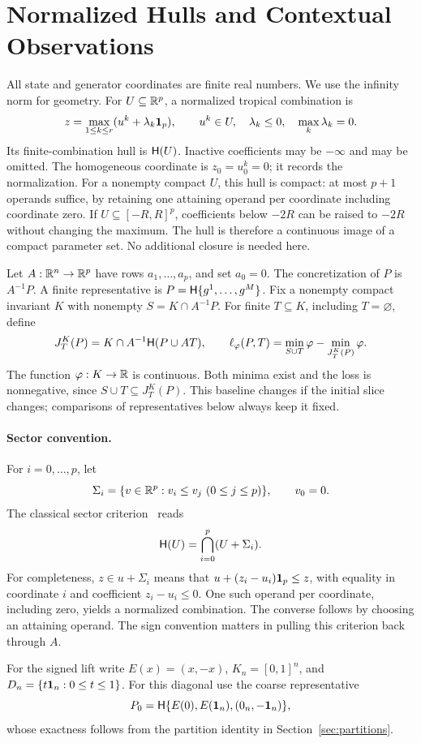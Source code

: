 \section{Normalized Hulls and Contextual Observations}\label{sec:contexts}
All state and generator coordinates are finite real numbers. We use the infinity norm for geometry. For $U\subseteq\mathbb R^p$, a normalized tropical combination is
\[
z=\max_{1\le k\le r}(u^k+\lambda_k\mathbf 1_p),\qquad
u^k\in U,\quad \lambda_k\le0,\quad \max_k\lambda_k=0.
\]
Its finite-combination hull is $\mathsf H(U)$. Inactive coefficients may be $-\infty$ and may be omitted. The homogeneous coordinate is $z_0=u_0^k=0$; it records the normalization. For a nonempty compact $U$, this hull is compact: at most $p+1$ operands suffice, by retaining one attaining operand per coordinate including coordinate zero. If $U\subseteq[-R,R]^p$, coefficients below $-2R$ can be raised to $-2R$ without changing the maximum. The hull is therefore a continuous image of a compact parameter set. No additional closure is needed here.

Let $A:\mathbb R^n\to\mathbb R^p$ have rows $a_1,\ldots,a_p$, and set $a_0=0$. The concretization of $P$ is $A^{-1}P$. A finite representative is $P=\mathsf H\{g^1,\ldots,g^M\}$. Fix a nonempty compact invariant $K$ with nonempty $S=K\cap A^{-1}P$. For finite $T\subseteq K$, including $T=\varnothing$, define
\begin{equation}\label{eq:join-loss}
J_T^K(P)=K\cap A^{-1}\mathsf H(P\cup AT),\qquad
\ell_\varphi(P,T)=\min_{S\cup T}\varphi-\min_{J_T^K(P)}\varphi.
\end{equation}
The function $\varphi:K\to\mathbb R$ is continuous. Both minima exist and the loss is nonnegative, since $S\cup T\subseteq J_T^K(P)$. This baseline changes if the initial slice changes; comparisons of representatives below always keep it fixed.

\paragraph{Sector convention.}
For $i=0,\ldots,p$, let
\[
\Sigma_i=\{v\in\mathbb R^p:v_i\le v_j\ (0\le j\le p)\},\qquad v_0=0.
\]
The classical sector criterion~\cite[Prop.~1.1]{hill2020} reads
\begin{equation}\label{eq:sectors}
\mathsf H(U)=\bigcap_{i=0}^p(U+\Sigma_i).
\end{equation}
For completeness, $z\in u+\Sigma_i$ means that $u+(z_i-u_i)\mathbf 1_p\le z$, with equality in coordinate $i$ and coefficient $z_i-u_i\le0$. One such operand per coordinate, including zero, yields a normalized combination. The converse follows by choosing an attaining operand. The sign convention matters in pulling this criterion back through $A$.

For the signed lift write $E(x)=(x,-x)$, $K_n=[0,1]^n$, and $D_n=\{t\mathbf 1_n:0\le t\le1\}$. For this diagonal use the coarse representative
\begin{equation}\label{eq:p0}
P_0=\mathsf H\{E(0),E(\mathbf 1_n),(0_n,-\mathbf 1_n)\},
\end{equation}
whose exactness follows from the partition identity in Section~\ref{sec:partitions}.
